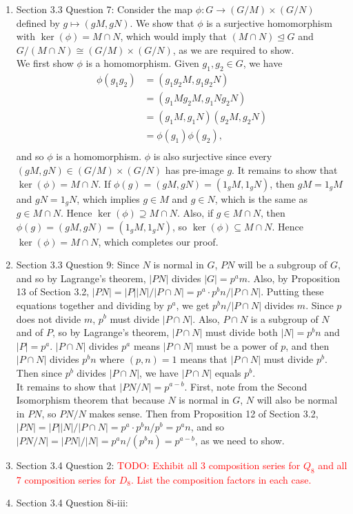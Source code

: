 \documentclass{article}
\newcommand{\TODO}[1]{\textcolor{red}{TODO: #1}}
\begin{document}
\begin{enumerate}
  \item Section 3.3 Question 7: Consider the map $\phi:G
    \rightarrow(G/M)\times(G/N)$ defined by $g\mapsto(gM,gN)$. We show
    that $\phi$ is a surjective homomorphism with $\ker(\phi)=M\cap N$,
    which would imply that $(M\cap N)\trianglelefteq G$ and $G/(M\cap
    N)\cong(G/M)\times(G/N)$, as we are required to show. \\

    We first show $\phi$ is a homomorphism. Given $g_1,g_2\in G$, we have
    \begin{align*}
      \phi(g_1g_2)  &= (g_1g_2M,g_1g_2N)      \\
                    &= (g_1Mg_2M,g_1Ng_2N)    \\
                    &= (g_1M,g_1N)(g_2M,g_2N) \\
                    &= \phi(g_1)\phi(g_2),    \\
    \end{align*}
    and so $\phi$ is a homomorphism. $\phi$ is also surjective since every
    $(gM,gN)\in(G/M)\times(G/N)$ has pre-image $g$. It remains to show
    that $\ker(\phi)=M\cap N$. If $\phi(g)=(gM,gN)=(1_gM,1_gN)$, then
    $gM=1_gM$ and $gN=1_gN$, which implies $g\in M$ and $g\in N$, which is
    the same as $g\in M\cap N$. Hence
    $\ker(\phi)\supseteq M\cap N$. Also, if $g\in M\cap N$, then
    $\phi(g)=(gM,gN)=(1_gM,1_gN)$, so $\ker(\phi)\subseteq M\cap N$.
    Hence $\ker(\phi)=M\cap N$, which completes our proof.

  \item Section 3.3 Question 9: Since $N$ is normal in $G$, $PN$ will be a
    subgroup of $G$, and so by Lagrange's theorem, $|PN|$ divides
    $|G|=p^am$. Also, by Proposition 13 of Section 3.2,
    $|PN|=|P||N|/|P\cap N|=p^a\cdot p^bn/|P\cap N|$. Putting these
    equations together and dividing by $p^a$, we get $p^bn/|P\cap N|$
    divides $m$. Since $p$ does not divide $m$, $p^b$ must divide $|P\cap
    N|$. Also, $P\cap N$ is a subgroup of $N$ and of $P$, so by Lagrange's
    theorem, $|P\cap N|$ must divide both $|N|=p^bn$ and $|P|=p^a$. $|P\cap
    N|$ divides $p^a$ means $|P\cap N|$ must be a power of $p$, and then
    $|P\cap N|$ divides $p^bn$ where $(p,n)=1$ means that $|P\cap N|$ must
    divide $p^b$. Then since $p^b$ divides $|P\cap N|$, we have $|P\cap N|$
    equals $p^b$. \\

    It remains to show that $|PN/N|=p^{a-b}$. First, note from the Second
    Isomorphism theorem that because $N$ is normal in $G$, $N$ will also be
    normal in $PN$, so $PN/N$ makes sense. Then from Proposition 12 of
    Section 3.2, $|PN|=|P||N|/|P\cap N|=p^a\cdot p^bn/p^b=p^an$, and so
    $|PN/N|=|PN|/|N|=p^an/(p^bn)=p^{a-b}$, as we need to show.

  \item Section 3.4 Question 2: \TODO{Exhibit all 3 composition series for
    $Q_8$ and all 7 composition series for $D_8$. List the composition
    factors in each case.}

  \item Section 3.4 Question 8i-iii:
\end{enumerate}
\end{document}
